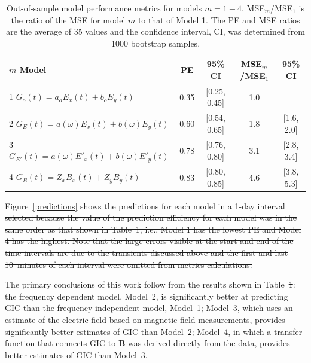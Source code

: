 \documentclass[draft,linenumbers]{agujournal2018}
\providecommand{\DIFaddtex}[1]{{\protect\color{blue}\uwave{#1}}} %
\providecommand{\DIFdeltex}[1]{{\protect\color{red}\sout{#1}}}                      %
\providecommand{\DIFaddbegin}{} %
\providecommand{\DIFaddend}{} %
\providecommand{\DIFdelbegin}{} %
\providecommand{\DIFdelend}{} %
\providecommand{\DIFaddFL}[1]{\DIFadd{#1}} %
\providecommand{\DIFdelFL}[1]{\DIFdel{#1}} %
\providecommand{\DIFaddbeginFL}{} %
\providecommand{\DIFaddendFL}{} %
\providecommand{\DIFdelbeginFL}{} %
\providecommand{\DIFdelendFL}{} %
\providecommand{\DIFadd}[1]{\texorpdfstring{\DIFaddtex{#1}}{#1}} %
\providecommand{\DIFdel}[1]{\texorpdfstring{\DIFdeltex{#1}}{}} %
\begin{document}
\begin{table}
\caption{Out-of-sample model performance metrics for models $m=1-4$. MSE\DIFdelbeginFL \DIFdelFL{$_m$}\DIFdelendFL \DIFaddbeginFL \DIFaddFL{$_1$}\DIFaddendFL /MSE\DIFdelbeginFL \DIFdelFL{$_1$ }\DIFdelendFL \DIFaddbeginFL \DIFaddFL{$_m$ }\DIFaddendFL is the ratio of the MSE for \DIFdelbeginFL \DIFdelFL{model $m$ }\DIFdelendFL \DIFaddbeginFL \DIFaddFL{Model~1 }\DIFaddendFL to that of Model \DIFdelbeginFL \DIFdelFL{1. }\DIFdelendFL \DIFaddbeginFL \DIFaddFL{$m$. }\DIFaddendFL The PE and MSE ratios are the average of 35 values and the confidence interval, CI, was determined from 1000 bootstrap samples.}
\centering
\begin{tabular}{l c c c c}
\hline
$m$\hspace{1em} Model & PE & 95\% CI & MSE\DIFdelbeginFL \DIFdelFL{$_m$}\DIFdelendFL \DIFaddbeginFL \DIFaddFL{$_1$}\DIFaddendFL /MSE\DIFdelbeginFL \DIFdelFL{$_1$ }\DIFdelendFL \DIFaddbeginFL \DIFaddFL{$_m$ }\DIFaddendFL & 95\% CI\\
\hline
1\hspace{1em} $G_o(t) = a_oE_x(t) + b_oE_y(t)$ & 0.35 & [0.25, 0.45] & 1.0 & \\
2\hspace{1em} $G_E(t) = a(\omega)E_x(t) + b(\omega)E_y(t)$ & 0.60 & [0.54, 0.65] & 1.8 & [1.6, 2.0]\\
3\hspace{1em} $G_{E'}(t) = a(\omega)E'_x(t) + b(\omega)E'_y(t)$ & 0.78 & [0.76, 0.80] & 3.1 & [2.8, 3.4]\\
4\hspace{1em} $G_{B}(t) = Z_xB_x(t) + Z_yB_y(t)$ & 0.83 & [0.80, 0.85] & 4.6 & [3.8, 5.3]\\
\hline
\end{tabular}
\label{results}
\end{table}

\DIFdelbegin \DIFdel{Figure~\ref{predictions} shows the predictions for each model in a 1-day interval selected because the value of the prediction efficiency for each model was in the same order as that shown in Table~1, i.e., Model 1 has the lowest PE and Model 4 has the highest. Note that the large errors visible at the start and end of the time intervals are due to the transients discussed above and the first and last 10~minutes of each interval were omitted from metrics calculations.
}%

\DIFdelend The primary conclusions of this work follow from the results shown in Table~\DIFdelbegin \DIFdel{1}\DIFdelend \DIFaddbegin \DIFadd{\ref{results}}\DIFaddend : the frequency dependent model, Model~2, is significantly better at predicting GIC than the frequency independent model, Model~1; Model~3, which uses an estimate of the electric field based on magnetic field measurements, provides significantly better estimates of GIC than Model~2; Model~4, in which a transfer function that connects GIC to $\mathbf{B}$ was derived directly from the data, provides better estimates of GIC than Model~3.
\end{document}
